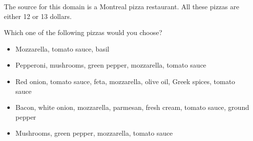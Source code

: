 The source for this domain is a Montreal pizza restaurant.
All these pizzas are either 12 or 13 dollars.

\begin{tcolorbox}
Which one of the following pizzas would you choose?

\begin{itemize}
	\item Mozzarella, tomato sauce, basil
	\item Pepperoni, mushrooms, green pepper, mozzarella, tomato sauce
	\item Red onion, tomato sauce, feta, mozzarella, olive oil, Greek spices,
tomato sauce
	\item Bacon, white onion, mozzarella, parmesan, fresh cream, tomato sauce,
ground pepper
	\item Mushrooms, green pepper, mozzarella, tomato sauce
\end{itemize}
\end{tcolorbox}
